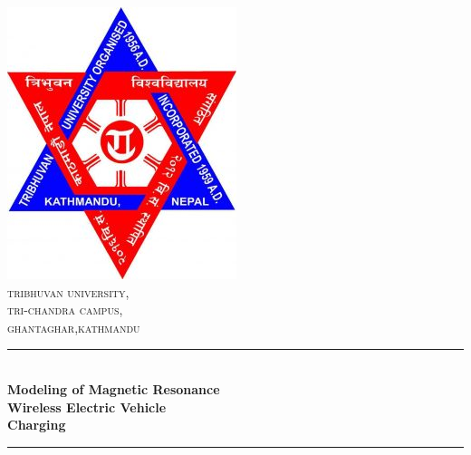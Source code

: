 \begin{titlepage}
	\newcommand{\HRule}{\rule{\linewidth}{1mm}} %
	\center %
	\includegraphics[scale=0.5]{logo.jpg}\\[1cm] %
	\textsc{\LARGE tribhuvan university, }\\[0.4cm] %
	\textsc{\Large tri-chandra campus,}\\[0.4cm] %
	\textsc{\large ghantaghar,kathmandu}\\[0.4cm] %
	\HRule \\[0.4cm]
	{ \huge \bfseries Modeling of Magnetic Resonance\\[0.4cm] Wireless Electric Vehicle\\[0.4cm] Charging}\\[0.4cm] %
	\HRule \\[1.5cm]



\end{titlepage}
